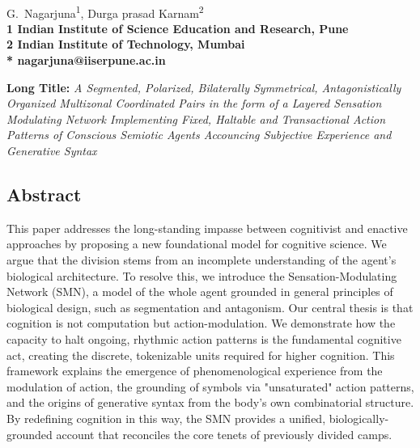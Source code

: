 \documentclass[10pt,letterpaper]{article}
\begin{document}
\vspace*{0.35in}

\begin{flushleft}
{\Large
\textbf{}
}
\newline
\\
G.~Nagarjuna\textsuperscript{1},
Durga prasad Karnam\textsuperscript{2}
\\
\bigskip
\bf{1} Indian Institute of Science Education and Research, Pune
\\
\bf{2} Indian Institute of Technology, Mumbai
\\
\bigskip
* nagarjuna@iiserpune.ac.in

\end{flushleft}
\noindent \textbf{Long Title:} \textit{A Segmented, Polarized,
  Bilaterally Symmetrical, Antagonistically Organized Multizonal
  Coordinated Pairs in the form of a Layered Sensation Modulating
  Network Implementing Fixed, Haltable and Transactional Action
  Patterns of Conscious Semiotic Agents Accouncing Subjective
  Experience and Generative Syntax}

\subsection*{Abstract}
This paper addresses the long-standing impasse between cognitivist and enactive approaches by proposing a new foundational model for cognitive science. We argue that the division stems from an incomplete understanding of the agent's biological architecture. To resolve this, we introduce the Sensation-Modulating Network (SMN), a model of the whole agent grounded in general principles of biological design, such as segmentation and antagonism. Our central thesis is that cognition is not computation but action-modulation. We demonstrate how the capacity to halt ongoing, rhythmic action patterns is the fundamental cognitive act, creating the discrete, tokenizable units required for higher cognition. This framework explains the emergence of phenomenological experience from the modulation of action, the grounding of symbols via "unsaturated" action patterns, and the origins of generative syntax from the body's own combinatorial structure. By redefining cognition in this way, the SMN provides a unified, biologically-grounded account that reconciles the core tenets of previously divided camps.
\end{document}
